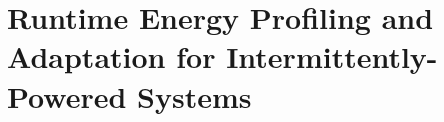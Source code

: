\chapter{Runtime Energy Profiling and Adaptation for Intermittently-Powered Systems}
\label{Chapter:opta}

\newcommand{\nn}{\textsc{Optic}}    %
\newcommand{\debs}{\textsc{Debs}}
\newcommand{\symb}[2]{#1_{\text{#2}}}










